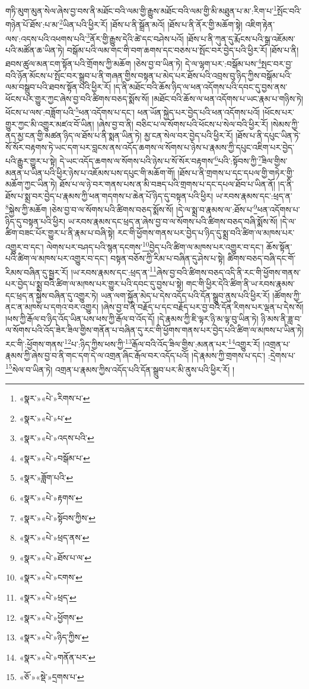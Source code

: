 གཏི་མུག་མུན་སེལ་ཞེས་བྱ་བས་ནི་མཐོང་བའི་ལམ་གྱི་རྒྱུས་མཐོང་བའི་ལམ་གྱི་མི་མཐུན་པ་མ་:རིག་པ་\footnote{«སྣར་»«པེ་»རིགས་པ་}སྤོང་བའི་གཉེན་པོ་ཐོས་:པ་མ་\footnote{«སྣར་»«པེ་»པ་}ཡིན་པའི་ཕྱིར་རོ། །ཐོས་པ་ནི་སྒྲོན་མའོ། །ཐོས་པ་ནི་ནོར་གྱི་མཆོག་སྟེ། འཇིག་རྟེན་ལས་:འདས་པའི་འཕགས་པའི་\footnote{«སྣར་»«པེ་»འདས་པའི་}ནོར་གྱི་རྒྱུས་དེའི་ཚེ་དང་བཤེས་པའོ། །ཐོས་པ་ནི་ཀུན་དུ་རྨོངས་པའི་སྒྲ་འཇོམས་པའི་མཚོན་ཆ་ཡིན་ཏེ། བསྒོམ་པའི་ལམ་གང་གི་བག་ཆགས་དང་བཅས་པ་སྤོང་བར་བྱེད་པའི་ཕྱིར་རོ། །ཐོས་པ་ནི། ཐབས་ཚུལ་མན་ངག་སྟོན་པའི་གྲོགས་ཀྱི་མཆོག །ཅེས་བྱ་བ་ཡིན་ཏེ། དེ་ལ་ལྷག་པར་:བསྒོམ་པས་\footnote{«སྣར་»«པེ་»བསྒོམ་པ་}སྤང་བར་བྱ་བའི་ཉོན་མོངས་པ་སྤོང་བར་སྒྲུབ་པ་ནི་གཞན་གྱིས་བསྟན་པ་མེད་པར་ཐོས་པའི་འབྲས་བུ་ཉིད་ཀྱིས་བསྒོམ་པའི་ལམ་བསྒྲུབ་པའི་ཐབས་སྟོན་པའི་ཕྱིར་རོ། །ད་ནི་མཐོང་བའི་ཆོས་ཉིད་ལ་ཕན་འདོགས་པའི་དབང་དུ་བྱས་ནས་ཕོངས་པར་གྱུར་ཀྱང་ཞེས་བྱ་བའི་ཚིགས་བཅད་སྨོས་སོ། །མཐོང་བའི་ཆོས་ལ་ཕན་འདོགས་པ་ཡང་རྣམ་པ་གཉིས་ཏེ། ཕོངས་པ་ལས་:བཟློག་པའི་\footnote{«སྣར་»ཟློག་པའི་}ཕན་འདོགས་པ་དང་། ཕན་ཡོན་སྐྱེད་པར་བྱེད་པའི་ཕན་འདོགས་པའོ། །ཕོངས་པར་གྱུར་ཀྱང་མི་འགྱུར་མཛའ་བོ་ཡིན། །ཞེས་བྱ་བ་ནི། བཅིང་པ་ལ་སོགས་པའི་ཕོངས་པ་སེལ་བའི་ཕྱིར་རོ། །སེམས་ཀྱི་ནད་མྱ་ངན་གྱི་མཚན་ཉིད་ལ་ཐོས་པ་ནི་སྨན་ཡིན་ཏེ། མྱ་ངན་སེལ་བར་བྱེད་པའི་ཕྱིར་རོ། །ཐོས་པ་ནི་དཔུང་ཡིན་ཏེ་སོ་སོར་བརྟགས་ཏེ་ཡང་དག་པར་བླངས་ནས་འདོད་ཆགས་ལ་སོགས་པ་ཉེས་པ་རྣམས་ཀྱི་དཔུང་འཇིག་པར་བྱེད་པའི་རྒྱུར་གྱུར་པ་སྟེ། དེ་ཡང་འདོད་ཆགས་ལ་སོགས་པའི་ཉེས་པ་སོ་སོར་བརྟགས་\footnote{«སྣར་»«པེ་»རྟགས་}པའི་:སྟོབས་ཀྱི་\footnote{«སྣར་»«པེ་»སྟོབས་ཀྱིས་}ཟིལ་གྱིས་མནན་པ་ཡིན་པའི་ཕྱིར་ཉེས་པ་འཇོམས་པས་དཔུང་གི་མཆོག་གོ། །ཐོས་པ་ནི་གྲགས་པ་དང་དཔལ་གྱི་གཏེར་གྱི་མཆོག་ཀྱང་ཡིན་ཏེ། ཐོས་པ་ལ་ཉེ་བར་གནས་པས་ན་མི་བཟད་པའི་གྲགས་པ་དང་དཔལ་ཐོབ་པ་ཡིན་ནོ། །ད་ནི་ཐོས་པ་སྨྲ་བར་བྱེད་པ་རྣམས་ཀྱི་ཕན་གདགས་པ་ཆེན་པོ་ཉིད་དུ་བསྟན་པའི་ཕྱིར། ཡ་རབས་རྣམས་དང་:ཕྲད་ན་\footnote{«སྣར་»«པེ་»ཕྲད་ནས་}སྐྱེས་ཀྱི་མཆོག །ཅེས་བྱ་བ་ལ་སོགས་པའི་ཚིགས་བཅད་སྨོས་སོ། །དེ་ལ་སྨྲ་བ་རྣམས་ལ་:ཐོས་པ་\footnote{«སྣར་»«པེ་»ཐོས་པ་ལ་}ཕན་འདོགས་པ་ཉིད་དུ་བསྟན་པའི་ཕྱིར། ཡ་རབས་རྣམས་དང་ཕྲད་ན་ཞེས་བྱ་བ་ལ་སོགས་པའི་ཚིགས་བཅད་བཞི་སྨོས་སོ། །དེ་ལ་ཚིག་བཟང་པོར་གྱུར་པ་ནི་རྣམ་པ་བཞི་སྟེ། རང་གི་ཕྱོགས་གནས་པར་བྱེད་པ་ཉིད་དུ་སྨྲ་བའི་ཚིག་ལ་མཁས་པར་འགྱུར་བ་དང་། ལེགས་པར་བཤད་པའི་སྙན་དངགས་\footnote{«སྣར་»«པེ་»ངགས་}བྱེད་པའི་ཚིག་ལ་མཁས་པར་འགྱུར་བ་དང་། ཆོས་སྟོན་པའི་ཚིག་ལ་མཁས་པར་འགྱུར་བ་དང་། བསྟན་བཅོས་ཀྱི་རིམ་པ་བཞིན་དུ་ཤེས་པ་སྟེ། ཚིགས་བཅད་བཞི་དང་གོ་རིམས་བཞིན་དུ་སྦྱར་རོ། །ཡ་རབས་རྣམས་དང་:ཕྲད་ན་\footnote{«སྣར་»«པེ་»ཕྲད་}ཞེས་བྱ་བའི་ཚིགས་བཅད་འདི་ནི་རང་གི་ཕྱོགས་གནས་པར་བྱེད་པ་སྨྲ་བའི་ཚིག་ལ་མཁས་པར་གྱུར་པའི་དབང་དུ་བྱས་པ་སྟེ། གང་གི་ཕྱིར་དེའི་ཚིག་ནི་ཡ་རབས་རྣམས་དང་ཕྲད་ན་སྐྱེས་བཞིན་དུ་འགྱུར་ཏེ། ཡན་ལག་སྐྱོན་མེད་པ་དེས་འདོད་པའི་དོན་སྒྲུབ་ནུས་པའི་ཕྱིར་རོ། །ཚོགས་ཀྱི་ནང་ན་མཁས་པ་དགའ་བར་འགྱུར། །ཞེས་བྱ་བ་ནི་བརྗོད་པ་དང་བརྗོད་པར་བྱ་བའི་དོན་རིགས་པར་ལྡན་པ་དེས་སོ། །ཕས་ཀྱི་རྒོལ་བ་ཉིད་འོད་ཡིན་པས་ཕས་ཀྱི་རྒོལ་བ་འོད་དོ། །དེ་རྣམས་ཀྱི་ཇི་ལྟར་ཉི་མ་ལྟ་བུ་ཡིན་ཏེ། ཉི་མས་ནི་ཟླ་བ་ལ་སོགས་པའི་འོད་ཟེར་ཟིལ་གྱིས་གནོན་པ་བཞིན་དུ་རང་གི་ཕྱོགས་གནས་པར་བྱེད་པའི་ཚིག་ལ་མཁས་པ་ཡིན་ཏེ། རང་གི་:ཕྱོགས་གནས་\footnote{«སྣར་»«པེ་»ཕྱོགས་}པ་:ཉིད་ཀྱིས་ཕས་ཀྱི་\footnote{«སྣར་»«པེ་»ཉིད་ཀྱིས་}རྒོལ་བའི་འོད་ཟིལ་གྱིས་:མནན་པར་\footnote{«སྣར་»«པེ་»གནོན་པར་}འགྱུར་རོ། །འགྲན་པ་རྣམས་ཀྱི་ཞེས་བྱ་བ་ནི་གང་དག་དེ་ལ་འགྲན་ཞིང་རྒོལ་བར་འདོད་པའོ། །དེ་རྣམས་ཀྱི་གྲགས་པ་དང་། :དྲེགས་པ་\footnote{«ཅོ་»«སྡེ་»དྲགས་པ་}སེལ་བ་ཡིན་ཏེ། འགྲན་པ་རྣམས་ཀྱིས་འདོད་པའི་དོན་སྒྲུབ་པར་མི་ནུས་པའི་ཕྱིར་རོ། །
